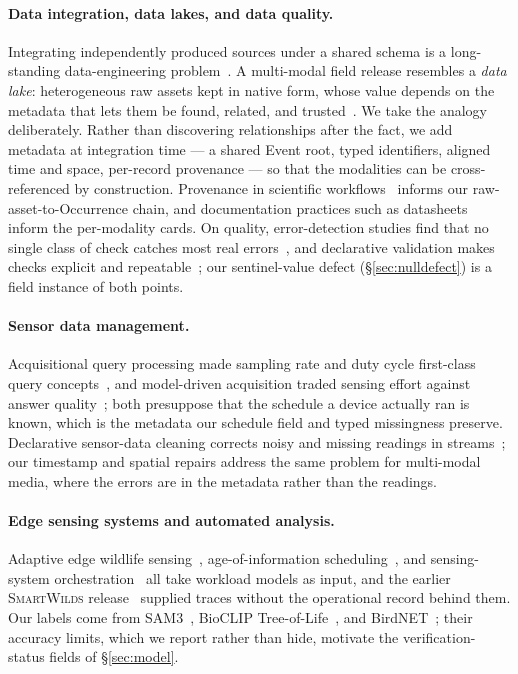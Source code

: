 \documentclass[sigconf]{acmart}
\newcommand{\smartwilds}{\textsc{SmartWilds}\xspace}
\begin{document}
\paragraph{Data integration, data lakes, and data quality.}
Integrating independently produced sources under a shared schema is a
long-standing data-engineering problem~\cite{halevy2006teenage}. A
multi-modal field release resembles a \emph{data lake}: heterogeneous
raw assets kept in native form, whose value depends on the metadata that
lets them be found, related, and trusted~\cite{nargesian2019datalake}.
We take the analogy deliberately. Rather than discovering relationships
after the fact, we add metadata at integration time --- a shared Event
root, typed identifiers, aligned time and space, per-record provenance
--- so that the modalities can be cross-referenced by construction.
Provenance in scientific workflows~\cite{simmhan2005provenance} informs
our raw-asset-to-Occurrence chain, and documentation practices such as
datasheets~\cite{gebru2021datasheets} inform the per-modality cards. On
quality, error-detection studies find that no single class of check
catches most real errors~\cite{abedjan2016detecting}, and declarative
validation makes checks explicit and repeatable~\cite{schelter2018deequ};
our sentinel-value defect (\S\ref{sec:nulldefect}) is a field instance of
both points.

\paragraph{Sensor data management.}
Acquisitional query processing made sampling rate and duty cycle
first-class query concepts~\cite{madden2005tinydb}, and model-driven
acquisition traded sensing effort against answer
quality~\cite{deshpande2004model}; both presuppose that the schedule a
device actually ran is known, which is the metadata our schedule field
and typed missingness preserve. Declarative sensor-data cleaning
corrects noisy and missing readings in
streams~\cite{jeffery2006declarative}; our timestamp and spatial repairs
address the same problem for multi-modal media, where the errors are in
the metadata rather than the readings.

\paragraph{Edge sensing systems and automated analysis.}
Adaptive edge wildlife
sensing~\cite{rastikerdar2026wildfit,Pestell2025SmartCamera},
age-of-information scheduling~\cite{huang2025ageofevent}, and
sensing-system orchestration~\cite{lin2025skyeye,liu2026eric} all take
workload models as input, and the earlier \smartwilds
release~\cite{kline2025smartwilds} supplied traces without the
operational record behind them. Our labels come from
SAM3~\cite{carion2026sam}, BioCLIP
Tree-of-Life~\cite{stevens2024bioclip,gu2025bioclip,treeoflife_200m},
and BirdNET~\cite{kahl2021birdnet,Besson2022Automated}; their accuracy
limits, which we report rather than hide, motivate the
verification-status fields of \S\ref{sec:model}.
\end{document}

